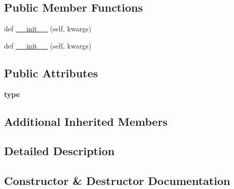 \subsection*{Public Member Functions}
\begin{DoxyCompactItemize}
\item 
def \hyperlink{classremi_1_1gui_1_1MenuBar_a78d9330ef0350718c644347f2ec2e846}{\+\_\+\+\_\+init\+\_\+\+\_\+} (self, kwargs)
\item 
def \hyperlink{classremi_1_1gui_1_1MenuBar_a78d9330ef0350718c644347f2ec2e846}{\+\_\+\+\_\+init\+\_\+\+\_\+} (self, kwargs)
\end{DoxyCompactItemize}
\subsection*{Public Attributes}
\begin{DoxyCompactItemize}
\item 
{\bfseries type}\hypertarget{classremi_1_1gui_1_1MenuBar_ab3ffc656a1392f4d26fa258329225809}{}\label{classremi_1_1gui_1_1MenuBar_ab3ffc656a1392f4d26fa258329225809}

\end{DoxyCompactItemize}
\subsection*{Additional Inherited Members}


\subsection{Detailed Description}
\begin{DoxyVerb}\end{DoxyVerb}
 

\subsection{Constructor \& Destructor Documentation}
